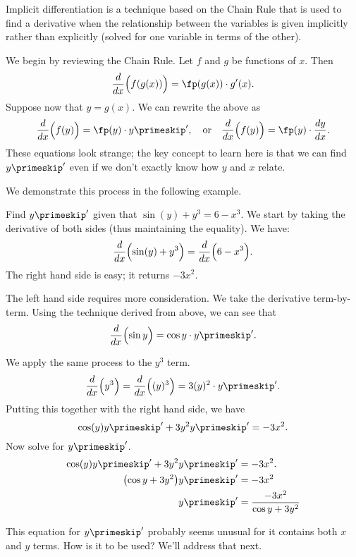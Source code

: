 Implicit differentiation is a technique based on the Chain Rule that is used to find a derivative when the relationship between the variables is given implicitly rather than explicitly (solved for one variable in terms of the other).\bigskip

We begin by reviewing the Chain Rule. Let $f$ and $g$ be functions of $x$. Then \[\frac{d}{dx}\Bigl(f(g(x))\Bigr) = \fp(g(x))\cdot g'(x).\]
Suppose now that $y=g(x)$. We can rewrite the above as
\begin{equation}
\frac{d}{dx}\Bigl(f(y)\Bigr) = \fp(y)\cdot y\primeskip', \quad \text{or}\quad
\frac{d}{dx}\Bigl(f(y)\Bigr) = \fp(y)\cdot \frac{dy}{dx} .\label{eq:implicit1}
\end{equation}
These equations look strange; the key concept to learn here is that we can find $y\primeskip'$ even if we don't exactly know how $y$ and $x$ relate.


We demonstrate this process in the following example.

\begin{example}\label{ex_implicit1}
Find $y\primeskip'$ given that $\sin(y) + y^3=6-x^3$.
\solution
We start by taking the derivative of both sides (thus maintaining the equality). We have:
\[\frac{d}{dx}\Bigl(\sin(y) + y^3\Bigr)=\frac{d}{dx}\Bigl(6-x^3\Bigr).\]
The right hand side is easy; it returns $-3x^2$. 

The left hand side requires more consideration. We take the derivative term-by-term.  Using the technique derived from  above, we can see that
\[\frac{d}{dx}\Bigl(\sin y\Bigr) = \cos y \cdot y\primeskip'.\] %

We apply the same process to the $y^3$ term. 
\[
\frac{d}{dx}\Bigl(y^3\Bigr) = \frac{d}{dx}\Bigl((y)^3\Bigr) = 3(y)^2\cdot y\primeskip'.
\]
Putting this together with the right hand side, we have
\[\cos(y)y\primeskip'+3y^2y\primeskip' = -3x^2.\]
Now solve for $y\primeskip'$.
\begin{align*}
	\cos(y)y\primeskip'+3y^2y\primeskip' 	&= -3x^2.\\
	\bigl(\cos y+3y^2\bigr)y\primeskip' &=	-3x^2\\
	y\primeskip'&=	\frac{-3x^2}{\cos y+3y^2}
\end{align*}

This equation for $y\primeskip'$ probably seems unusual for it contains both $x$ and $y$ terms. How is it to be used? We'll address that next.
\end{example}

